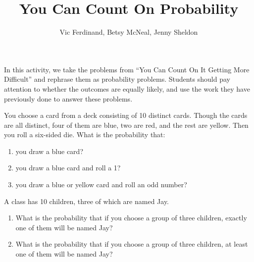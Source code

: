 \documentclass{ximera}
\title{You Can Count On Probability}
\author{Vic Ferdinand, Betsy McNeal, Jenny Sheldon}
\begin{document}
\begin{abstract}
\end{abstract}
\maketitle

\begin{instructorIntro}
In this activity, we take the problems from ``You Can Count On It Getting More Difficult'' and rephrase them as probability problems.  Students should pay attention to whether the outcomes are equally likely, and use the work they have previously done to answer these problems.

\end{instructorIntro}


\begin{problem}
You choose a card from a deck consisting of 10 distinct cards.  Though the cards are all distinct, four of them are blue, two are red, and the rest are yellow.  Then you roll a six-sided die.  What is the probability that:
\begin{enumerate}
\item you draw a blue card?
\item you draw a blue card and roll a 1?
\item you draw a blue or yellow card and roll an odd number?
\end{enumerate}
\end{problem}

\begin{problem}
A class has 10 children, three of which are named Jay.  
\begin{enumerate}
\item What is the probability that if you choose a group of three children, exactly one of them will be named Jay?
\item What is the probability that if you choose a group of three children, at least one of them will be named Jay?
\end{enumerate}
\end{problem}
\end{document}
